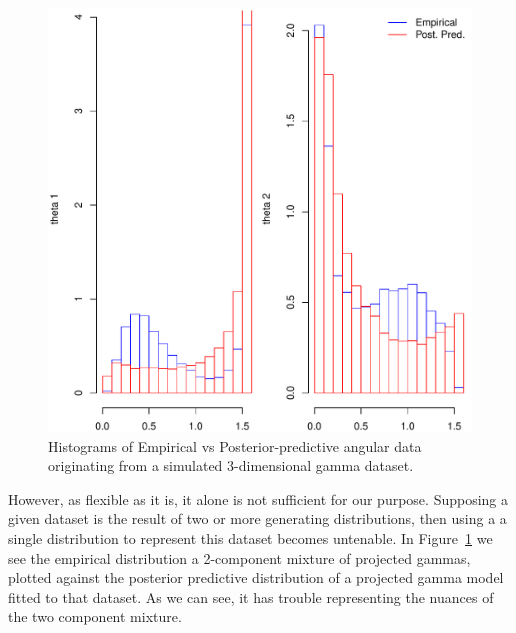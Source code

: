 \begin{figure}[h!]
  \centering
  \label{fig:vanillamix}
  \includegraphics[width=5in]{./images/justification_for_more_complex_models}
  \caption{Histograms of Empirical vs Posterior-predictive angular data originating
            from a simulated 3-dimensional gamma dataset.}
\end{figure}

However, as flexible as it is, it alone is not sufficient for our purpose.  Supposing
  a given dataset is the result of two or more generating distributions, then using a
  a single distribution to represent this dataset becomes untenable.  In Figure~\ref{fig:vanillamix}
  we see the empirical distribution a 2-component mixture of projected gammas, plotted
  against the posterior predictive distribution of a projected gamma model fitted to
  that dataset.  As we can see, it has trouble representing the nuances of the two
  component mixture.


